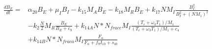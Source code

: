 \documentclass{article}
\begin{document}
	\begin{equation}
		\begin{aligned}
			\frac{dB_E}{dt} ={} & \alpha_{20} B_E + \mu_I B_I - k_{15} M_A B_E - k_{18} M_R B_E + k_{17} N M_I \frac{B_I^2} {B_I^2 + (N M_1)^2}\\
			& - k_2 \frac{N}{2} M_R \frac{B_E}{B_E + c_9} + k_{14A} N * N_{fracc} M_I \frac{(T_c + \omega_3 T_1)/M_1}{(T_c + \omega_3 T_1)/M_1 + c_4}\\
			& + k_{14B} N * N_{fraca} M_I \frac{F_\alpha}{F_\alpha + f_9 I_{10} + s_{4b}}
		\end{aligned}
	\end{equation}
	
	
\end{document}
